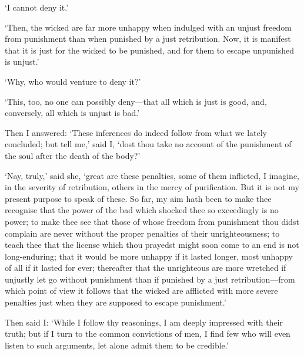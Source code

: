 \documentclass[11pt]{book}
\begin{document}
`I cannot deny it.'

`Then, the wicked are far more unhappy when indulged with an unjust
freedom from punishment than when punished by a just retribution. Now,
it is manifest that it is just for the wicked to be punished, and for
them to escape unpunished is unjust.'

`Why, who would venture to deny it?'

`This, too, no one can possibly deny---that all which is just is good,
and, conversely, all which is unjust is bad.'

Then I answered: `These inferences do indeed follow from what we lately
concluded; but tell me,' said I, `dost thou take no account of the
punishment of the soul after the death of the body?'

`Nay, truly,' said she, `great are these penalties, some of them
inflicted, I imagine, in the severity of retribution, others in the
mercy of purification. But it is not my present purpose to speak of
these. So far, my aim hath been to make thee recognise that the power of
the bad which shocked thee so exceedingly is no power; to make thee see
that those of whose freedom from punishment thou didst complain are
never without the proper penalties of their unrighteousness; to teach
thee that the license which thou prayedst might soon come to an end is
not long-enduring; that it would be more unhappy if it lasted longer,
most unhappy of all if it lasted for ever; thereafter that the
unrighteous are more wretched if unjustly let go without punishment than
if punished by a just retribution---from which point of view it follows
that the wicked are afflicted with more severe penalties just when they
are supposed to escape punishment.'

Then said I: `While I follow thy reasonings, I am \linebreak deeply impressed with
their truth; but if I turn to the common convictions of men, I find few
who will even listen to such arguments, let alone admit them to be
credible.'
\end{document}
